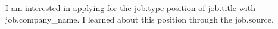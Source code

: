 I am interested in applying for the {{job.type}} position of {{job.title}} with {{job.company_name}}.
I learned about this position through the {{job.source}}.